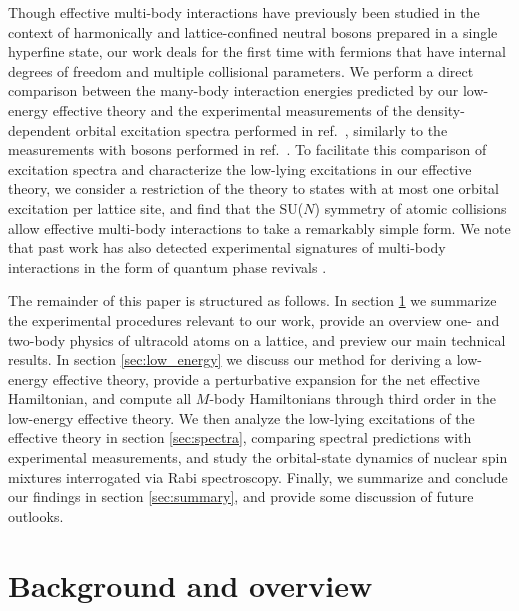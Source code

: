 \documentclass[preprint,showkeys,nofootinbib]{revtex4-1}
\newcommand{\1}{\mathds{1}}
\begin{document}
Though effective multi-body interactions have previously been studied
in the context of harmonically \cite{johnson2012effective,
  yin2014universal} and lattice-confined \cite{johnson2009effective}
neutral bosons prepared in a single hyperfine state, our work deals
for the first time with fermions that have internal degrees of freedom
and multiple collisional parameters.  We perform a direct comparison
between the many-body interaction energies predicted by our low-energy
effective theory and the experimental measurements of the
density-dependent orbital excitation spectra performed in
ref.~\cite{goban2018emergence}, similarly to the measurements with
bosons performed in ref.~\cite{mark2011precision}.  To facilitate this
comparison of excitation spectra and characterize the low-lying
excitations in our effective theory, we consider a restriction of the
theory to states with at most one orbital excitation per lattice site,
and find that the SU($N$) symmetry of atomic collisions allow
effective multi-body interactions to take a remarkably simple form.
We note that past work has also detected experimental signatures of
multi-body interactions in the form of quantum phase revivals
\cite{will2010timeresolved}.

The remainder of this paper is structured as follows.  In section
\ref{sec:overview} we summarize the experimental procedures relevant
to our work, provide an overview one- and two-body physics of
ultracold atoms on a lattice, and preview our main technical results.
In section \ref{sec:low_energy} we discuss our method for deriving a
low-energy effective theory, provide a perturbative expansion for the
net effective Hamiltonian, and compute all $M$-body Hamiltonians
through third order in the low-energy effective theory.  We then
analyze the low-lying excitations of the effective theory in section
\ref{sec:spectra}, comparing spectral predictions with experimental
measurements, and study the orbital-state dynamics of nuclear spin
mixtures interrogated via Rabi spectroscopy.  Finally, we summarize
and conclude our findings in section \ref{sec:summary}, and provide
some discussion of future outlooks.


\section{Background and overview}
\label{sec:overview}
\end{document}
